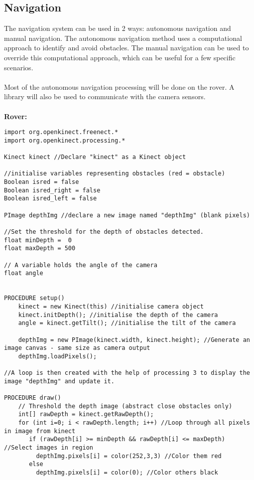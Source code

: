\documentclass[11pt]{report}
\begin{document}
\subsection{Navigation}
The navigation system can be used in 2 ways: autonomous navigation and manual navigation. The autonomous navigation method uses a computational approach to identify and avoid obstacles. The manual navigation can be used to override this computational approach, which can be useful for a few specific scenarios. 
\\\\
Most of the autonomous navigation processing will be done on the rover. A library will also be used to communicate with the camera sensors.
\\\\
\textbf{Rover:}
\begin{lstlisting}
import org.openkinect.freenect.*
import org.openkinect.processing.*

Kinect kinect //Declare "kinect" as a Kinect object 

//initialise variables representing obstacles (red = obstacle)
Boolean isred = false
Boolean isred_right = false
Boolean isred_left = false

PImage depthImg //declare a new image named "depthImg" (blank pixels)

//Set the threshold for the depth of obstacles detected.
float minDepth =  0
float maxDepth = 500

// A variable holds the angle of the camera
float angle


PROCEDURE setup() 
	kinect = new Kinect(this) //initialise camera object
	kinect.initDepth(); //initialise the depth of the camera
	angle = kinect.getTilt(); //initialise the tilt of the camera

	depthImg = new PImage(kinect.width, kinect.height); //Generate an image canvas - same size as camera output
	depthImg.loadPixels();

//A loop is then created with the help of processing 3 to display the image "depthImg" and update it.

PROCEDURE draw()
	// Threshold the depth image (abstract close obstacles only)
 	int[] rawDepth = kinect.getRawDepth();
 	for (int i=0; i < rawDepth.length; i++) //Loop through all pixels in image from kinect
 	   if (rawDepth[i] >= minDepth && rawDepth[i] <= maxDepth) //Select images in region
 	     depthImg.pixels[i] = color(252,3,3) //Color them red
 	   else 
 	     depthImg.pixels[i] = color(0); //Color others black
 

\end{lstlisting}
\end{document}
